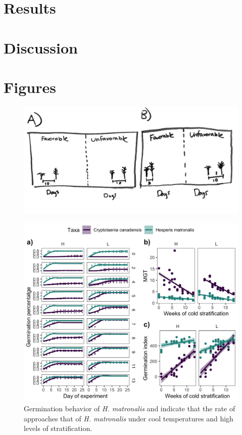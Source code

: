\documentclass[11pt]{article}\usepackage[]{graphicx}\usepackage[]{color}
\begin{document}
\section*{Results}


\section*{Discussion}
\section*{Figures}
\begin{figure}[h!]
    \centering
         \includegraphics[width=\textwidth]{..//full_exp/concept_sketch.jpeg}
    \caption{ } 
    \label{fig:concept}
\end{figure}

\begin{figure}[h!]
    \centering
         \includegraphics[width=\textwidth]{..//figure/crp_hesp1.jpeg}
    \caption{Germination behavior of \textit{H. matronalis} and  indicate that the rate of  approaches that of \textit{H. matronalis} under cool temperatures and high levels of stratification. } 
    \label{fig:aft}
\end{figure}
\end{document}
